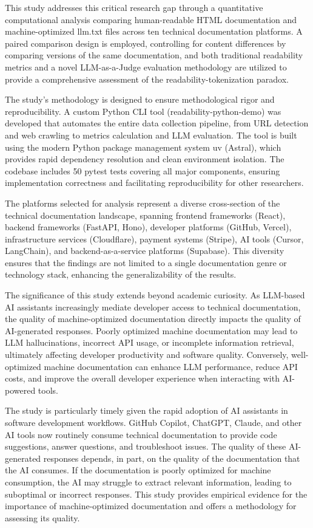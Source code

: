 \documentclass[10pt,conference,a4paper]{IEEEtran}
\begin{document}
This study addresses this critical research gap through a quantitative computational analysis comparing human-readable HTML documentation and machine-optimized llm.txt files across ten technical documentation platforms. A paired comparison design is employed, controlling for content differences by comparing versions of the same documentation, and both traditional readability metrics and a novel LLM-as-a-Judge evaluation methodology are utilized to provide a comprehensive assessment of the readability-tokenization paradox.

The study's methodology is designed to ensure methodological rigor and reproducibility. A custom Python CLI tool (readability-python-demo) was developed that automates the entire data collection pipeline, from URL detection and web crawling to metrics calculation and LLM evaluation. The tool is built using the modern Python package management system uv (Astral), which provides rapid dependency resolution and clean environment isolation. The codebase includes 50 pytest tests covering all major components, ensuring implementation correctness and facilitating reproducibility for other researchers.

The platforms selected for analysis represent a diverse cross-section of the technical documentation landscape, spanning frontend frameworks (React), backend frameworks (FastAPI, Hono), developer platforms (GitHub, Vercel), infrastructure services (Cloudflare), payment systems (Stripe), AI tools (Cursor, LangChain), and backend-as-a-service platforms (Supabase). This diversity ensures that the findings are not limited to a single documentation genre or technology stack, enhancing the generalizability of the results.

The significance of this study extends beyond academic curiosity. As LLM-based AI assistants increasingly mediate developer access to technical documentation, the quality of machine-optimized documentation directly impacts the quality of AI-generated responses. Poorly optimized machine documentation may lead to LLM hallucinations, incorrect API usage, or incomplete information retrieval, ultimately affecting developer productivity and software quality. Conversely, well-optimized machine documentation can enhance LLM performance, reduce API costs, and improve the overall developer experience when interacting with AI-powered tools.

The study is particularly timely given the rapid adoption of AI assistants in software development workflows. GitHub Copilot, ChatGPT, Claude, and other AI tools now routinely consume technical documentation to provide code suggestions, answer questions, and troubleshoot issues. The quality of these AI-generated responses depends, in part, on the quality of the documentation that the AI consumes. If the documentation is poorly optimized for machine consumption, the AI may struggle to extract relevant information, leading to suboptimal or incorrect responses. This study provides empirical evidence for the importance of machine-optimized documentation and offers a methodology for assessing its quality.
\end{document}
